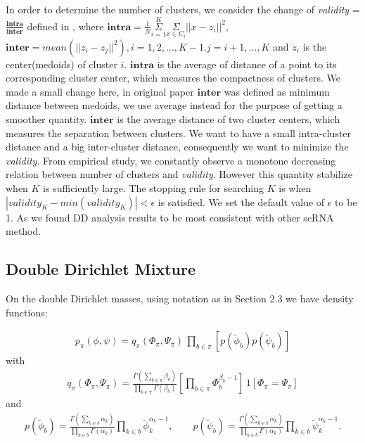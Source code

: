 \documentclass[aoas,preprint]{imsart}
\begin{document}
In order to determine the number of clusters, we consider the change of {\em validity} = $\frac{\textbf{intra}}{\textbf{inter}}$ defined in \cite{selK}, where $\textbf{intra} = \frac{1}{N}\overset{K}{\underset{i = 1}{\Sigma}}\underset{x \in C_i}{\Sigma} ||x - z_i||^2$, $\textbf{inter} = mean( || z_i - z_j||^2), i = 1,2,...,K-1. j = i+1,...,K$ and $z_i$ is the center(medoids) of cluster $i$. $\textbf{intra}$ is the average of distance of a point to its corresponding cluster center, which measures the compactness of clusters. We made a small change here, in original paper $\textbf{inter}$ was defined as minimum distance between medoids, we use average instead for the purpose of getting a smoother quantity. $\textbf{inter}$ is the average distance of two cluster centers, which measures the separation between clusters. We want to have a small intra-cluster distance and a big inter-cluster distance, consequently we want to minimize the {\em validity}. From empirical study, we constantly observe a monotone decreasing relation between number of clusters and {\em validity}. However this quantity stabilize when $K$ is sufficiently large. The stopping rule for searching $K$ is when $|validity_{K} - min(validity_K) | < \epsilon$ is satisfied. We set the default value of  $\epsilon$ to be 1.  As we found DD analysis results to be most consistent with other scRNA method.




\subsection{Double Dirichlet Mixture}

On the double Dirichlet masses, using notation as in Section 2.3 we have density functions:


\begin{eqnarray*}
p_\pi(\phi,\psi) =
         q_\pi( \Phi_\pi, \Psi_\pi  ) \, \prod_{b \in \pi}  \left[
         p( \tilde \phi_b ) p( \tilde \psi_b ) \right]
\end{eqnarray*}
with
\begin{eqnarray*}
q_\pi( \Phi_\pi, \Psi_\pi  )
= \frac{\Gamma(\sum_{b\in \pi} \beta_b)}{
 \prod_{b \in \pi} \Gamma( \beta_b )} \left[\prod_{b \in \pi} \Phi_b^{\beta_b-1} \right] \,
 1\left[ \Phi_\pi = \Psi_\pi \right]
\end{eqnarray*}
and
\begin{eqnarray*}
p( \tilde \phi_b ) =
\frac{ \Gamma( \sum_{k\in b} \alpha_k ) }{ \prod_{k\in b} \Gamma(\alpha_k) }
 \prod_{k \in b} \tilde \phi_k^{\alpha_k -1 },
\qquad
p( \tilde \psi_b )
=
\frac{ \Gamma( \sum_{k\in b} \alpha_k ) }{ \prod_{k\in b} \Gamma(\alpha_k) }
\prod_{k \in b} \tilde \psi_k^{\alpha_k -1 }.
\end{eqnarray*}
\end{document}
